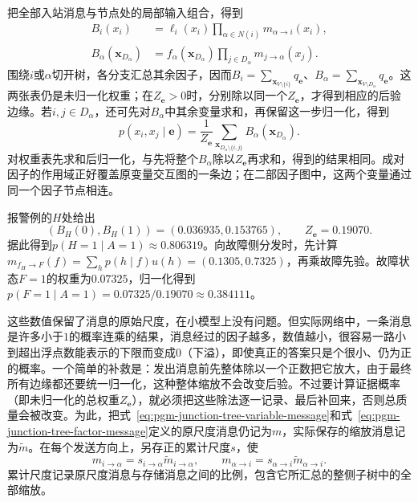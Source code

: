 把全部入站消息与节点处的局部输入组合，得到
\begin{equation}
  \begin{aligned}
    B_i(x_i)&=\ell_i(x_i)\prod_{\alpha\in N(i)}
       m_{\alpha\to i}(x_i),\\
    B_\alpha(\bm{x}_{D_\alpha})
      &=f_\alpha(\bm{x}_{D_\alpha})
        \prod_{j\in D_\alpha}m_{j\to\alpha}(x_j).
  \end{aligned}
  \label{eq:pgm-junction-tree-factor-beliefs}
\end{equation}
围绕$i$或$\alpha$切开树，各分支汇总其余因子，因而$B_i=\sum_{\bm{x}_{V\setminus\{i\}}}q_{\bm e}$、$B_\alpha=\sum_{\bm{x}_{V\setminus D_\alpha}}q_{\bm e}$。这两张表仍是未归一化权重；在$Z_{\bm e}>0$时，分别除以同一个$Z_{\bm e}$，才得到相应的后验边缘。若$i,j\in D_\alpha$，还可先对$B_\alpha$中其余变量求和，再保留这一步归一化，得到
\begin{equation}
  p(x_i,x_j\mid\bm e)
    =\frac{1}{Z_{\bm e}}
      \sum_{\bm{x}_{D_\alpha\setminus\{i,j\}}}
      B_\alpha(\bm{x}_{D_\alpha}).
  \label{eq:pgm-junction-tree-pair-marginal}
\end{equation}
对权重表先求和后归一化，与先将整个$B_\alpha$除以$Z_{\bm e}$再求和，得到的结果相同。成对因子的作用域正好覆盖原变量交互图的一条边；在二部因子图中，这两个变量通过同一个因子节点相连。

报警例的$H$处给出
\begin{equation}
  (B_H(0),B_H(1))=(0.036935,0.153765),
  \qquad Z_{\bm{e}}=0.19070.
  \label{eq:pgm-junction-tree-alarm-normalizer}
\end{equation}
据此得到$p(H=1\mid A=1)\approx0.806319$。向故障侧分发时，先计算$m_{f_H\to F}(f)=\sum_h p(h\mid f)u(h)=(0.1305,0.7325)$，再乘故障先验。故障状态$F=1$的权重为$0.07325$，归一化得到$p(F=1\mid A=1)=0.07325/0.19070\approx0.384111$。

这些数值保留了消息的原始尺度，在小模型上没有问题。但实际网络中，一条消息是许多小于$1$的概率连乘的结果，消息经过的因子越多，数值越小，很容易一路小到超出浮点数能表示的下限而变成$0$（下溢），即使真正的答案只是个很小、仍为正的概率。一个简单的补救是：发出消息前先整体除以一个正数把它放大，由于最终所有边缘都还要统一归一化，这种整体缩放不会改变后验。不过要计算证据概率（即未归一化的总权重$Z_{\bm e}$），就必须把这些除法逐一记录、最后补回来，否则总质量会被改变。为此，把式~\eqref{eq:pgm-junction-tree-variable-message}和式~\eqref{eq:pgm-junction-tree-factor-message}定义的原尺度消息仍记为$m$，实际保存的缩放消息记为$\widetilde m$。在每个发送方向上，另存正的累计尺度$s$，使
\[
  m_{i\to\alpha}=s_{i\to\alpha}\widetilde m_{i\to\alpha},
  \qquad
  m_{\alpha\to i}=s_{\alpha\to i}\widetilde m_{\alpha\to i}.
\]
累计尺度记录原尺度消息与存储消息之间的比例，包含它所汇总的整侧子树中的全部缩放。

